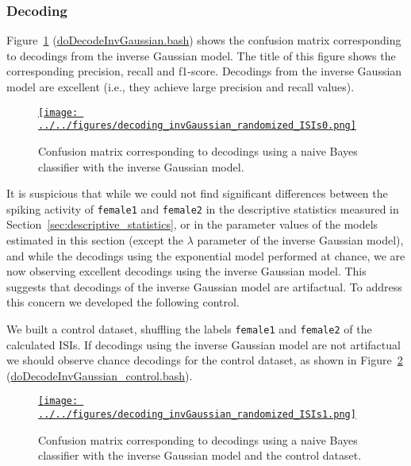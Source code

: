 \documentclass[10pt]{article}
\begin{document}
\subsubsection{Decoding}

Figure~\ref{fig:invGaussianModelConusionMatrix}
(\href{https://github.com/joacorapela/singleNeuronSpikesAnalysisTutorial/blob/master/code/scripts/doDecodeInvGaussian.bash}{doDecodeInvGaussian.bash})
shows the confusion matrix corresponding to decodings from the
inverse Gaussian model. The title of this figure shows the
corresponding precision, recall and f1-score. Decodings from the
inverse Gaussian model are excellent (i.e., they achieve large
precision and recall values).

\begin{figure}
    \href{http://www.gatsby.ucl.ac.uk/~rapela/singleNeuronSpikesAnalysisTutorial/figures/decoding_invGaussian_randomized_ISIs0.html}{\texttt{[image: ../../figures/decoding\_invGaussian\_randomized\_ISIs0.png]}}
    \caption{Confusion matrix corresponding to decodings using a naive Bayes classifier with the inverse Gaussian model.}
    \label{fig:invGaussianModelConusionMatrix}
\end{figure}

It is suspicious that while we could not find significant differences
between the spiking activity of \texttt{female1} and \texttt{female2} in the
descriptive statistics measured in Section~\ref{sec:descriptive_statistics}, or
in the parameter values of the models estimated in this section (except the $\lambda$
parameter of the inverse Gaussian model), and while the decodings using the
exponential model performed at chance, we are now observing excellent decodings
using the inverse Gaussian model. This suggests that decodings of the
inverse Gaussian model are artifactual. To address this concern we developed
the following control.

We built a control dataset, shuffling the labels \texttt{female1} and
\texttt{female2} of the calculated ISIs. If decodings using the inverse
Gaussian model are not artifactual we should observe chance decodings for the
control dataset, as shown in Figure~\ref{fig:invGaussianModelConusionMatrix_control}
(\href{https://github.com/joacorapela/singleNeuronSpikesAnalysisTutorial/blob/master/code/scripts/doDecodeInvGaussian_control.bash}{doDecodeInvGaussian\_control.bash}).

\begin{figure}
    \href{http://www.gatsby.ucl.ac.uk/~rapela/singleNeuronSpikesAnalysisTutorial/figures/decoding_invGaussian_randomized_ISIs1.html}{\texttt{[image: ../../figures/decoding\_invGaussian\_randomized\_ISIs1.png]}}
    \caption{Confusion matrix corresponding to decodings using a naive Bayes classifier with the inverse Gaussian model and the control dataset.}
    \label{fig:invGaussianModelConusionMatrix_control}
\end{figure}
\end{document}
